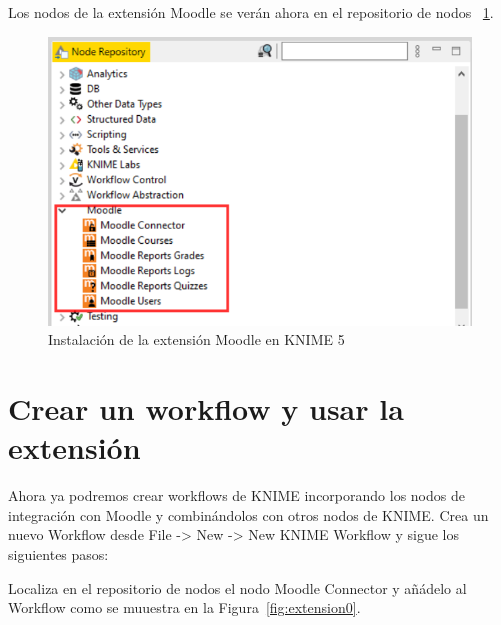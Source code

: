 Los nodos de la extensión Moodle se verán ahora en el repositorio de nodos ~\ref{fig:usuario5}. 

\begin{figure}[!htb]
	\centering
	\includegraphics[width=1\textwidth]{img/manual_usuario_install_site_update5.png}
	\caption{Instalación de la extensión Moodle en KNIME 5}
	\label{fig:usuario5}
\end{figure}
\FloatBarrier

\hphantom{ }

\newpage
\section{Crear un workflow y usar la extensión}

Ahora ya podremos crear workflows de KNIME incorporando los nodos de integración con Moodle y 
combinándolos con otros nodos de KNIME. Crea un nuevo Workflow desde File -> New -> New KNIME Workflow y sigue los siguientes pasos:  
\

Localiza en el repositorio de nodos el nodo Moodle Connector y añádelo al Workflow como se muuestra en la Figura~\ref{fig:extension0}.

